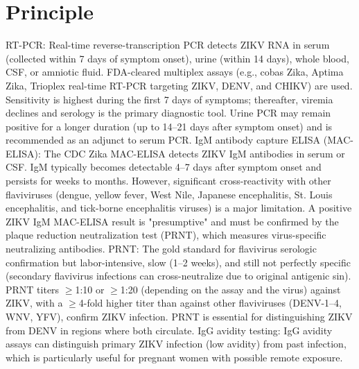 \section*{Principle}
RT-PCR: Real-time reverse-transcription PCR detects ZIKV RNA in serum (collected within 7 days of symptom onset), urine (within 14 days), whole blood, CSF, or amniotic fluid. FDA-cleared multiplex assays (e.g., cobas Zika, Aptima Zika, Trioplex real-time RT-PCR targeting ZIKV, DENV, and CHIKV) are used. Sensitivity is highest during the first 7 days of symptoms; thereafter, viremia declines and serology is the primary diagnostic tool. Urine PCR may remain positive for a longer duration (up to 14--21 days after symptom onset) and is recommended as an adjunct to serum PCR. IgM antibody capture ELISA (MAC-ELISA): The CDC Zika MAC-ELISA detects ZIKV IgM antibodies in serum or CSF. IgM typically becomes detectable 4--7 days after symptom onset and persists for weeks to months. However, significant cross-reactivity with other flaviviruses (dengue, yellow fever, West Nile, Japanese encephalitis, St. Louis encephalitis, and tick-borne encephalitis viruses) is a major limitation. A positive ZIKV IgM MAC-ELISA result is "presumptive" and must be confirmed by the plaque reduction neutralization test (PRNT), which measures virus-specific neutralizing antibodies. PRNT: The gold standard for flavivirus serologic confirmation but labor-intensive, slow (1--2 weeks), and still not perfectly specific (secondary flavivirus infections can cross-neutralize due to original antigenic sin). PRNT titers $\geq$1:10 or $\geq$1:20 (depending on the assay and the virus) against ZIKV, with a $\geq$4-fold higher titer than against other flaviviruses (DENV-1--4, WNV, YFV), confirm ZIKV infection. PRNT is essential for distinguishing ZIKV from DENV in regions where both circulate. IgG avidity testing: IgG avidity assays can distinguish primary ZIKV infection (low avidity) from past infection, which is particularly useful for pregnant women with possible remote exposure.

